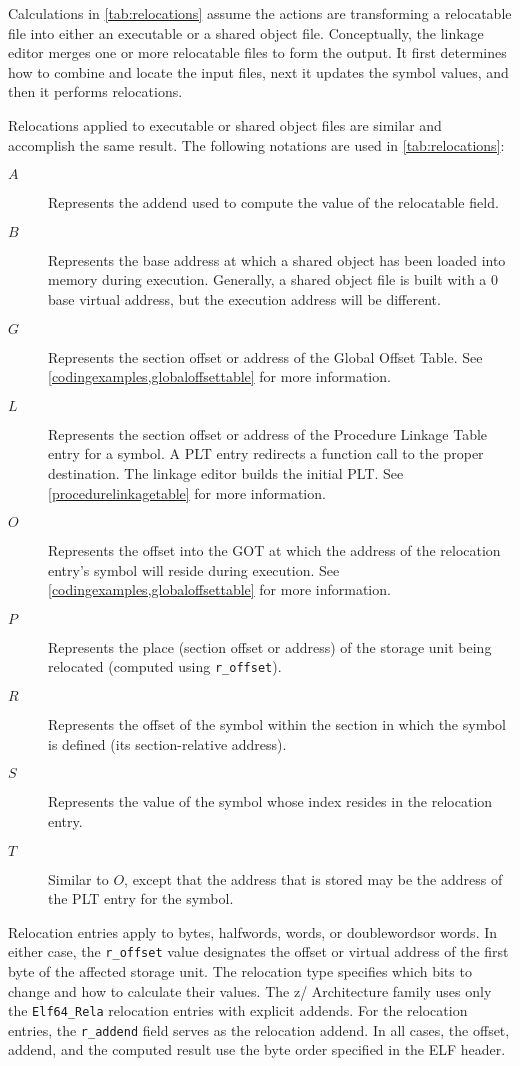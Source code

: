 \documentclass[english,11pt,twoside,toc=bib,toc=idx]{scrreprt}
\newcommand{\NBITS}{64}
\newcommand{\ARCH}{z/\kern-1pt Ar\-chi\-tec\-ture}
\newcommand{\NBITS}{32}
\newcommand{\ARCH}{ESA/390}
\begin{document}
Calculations in \cref{tab:relocations} assume the actions are
transforming a relocatable file into either an executable or a shared
object file.  Conceptually, the linkage editor merges one or more
relocatable files to form the output.  It first determines how to
combine and locate the input files, next it updates the symbol values,
and then it performs relocations.

Relocations applied to executable or shared object files are similar
and accomplish the same result.  The following notations are used in
\cref{tab:relocations}:

\begin{description}
\item[$A$] Represents the addend used to compute the value of the
  relocatable field.
\item[$B$] Represents the base address at which a shared object has
  been loaded into memory during execution.  Generally, a shared object
  file is built with a 0 base virtual address, but the execution
  address will be different.
\item[$G$] Represents the section offset or address of the Global
  Offset Table.  See \cref{codingexamples,globaloffsettable}
  for more information.
\item[$L$] Represents the section offset or address of the Procedure
  Linkage Table entry for a symbol.  A PLT entry redirects a function
  call to the proper destination.  The linkage editor builds the
  initial PLT\@.  See \cref{procedurelinkagetable} for more
  information.
\item[$O$] Represents the offset into the GOT at which the address of
  the relocation entry's symbol will reside during execution.  See
  \cref{codingexamples,globaloffsettable} for more
  information.
\item[$P$] Represents the place (section offset or address) of the
  storage unit being relocated (computed using \texttt{r\_offset}).
\item[$R$] Represents the offset of the symbol within the section in
  which the symbol is defined (its section-relative address).
\item[$S$] Represents the value of the symbol whose index resides in
  the relocation entry.
\item[$T$] Similar to $O$, except that the address that is stored may be
  the address of the PLT entry for the symbol.
\end{description}

Relocation entries apply to bytes, halfwords, {\ifzseries words, or
  doublewords\else or words\fi}.  In either case, the \texttt{r\_offset}
value designates the offset or virtual address of the first byte of the
affected storage unit.  The relocation type specifies which bits to change
and how to calculate their values.  The \ARCH{} family uses only the
\texttt{Elf\NBITS{}\_Rela} relocation entries with explicit addends.  For
the relocation entries, the \texttt{r\_addend} field serves as the
relocation addend.  In all cases, the offset, addend, and the computed
result use the byte order specified in the ELF header.
\end{document}

